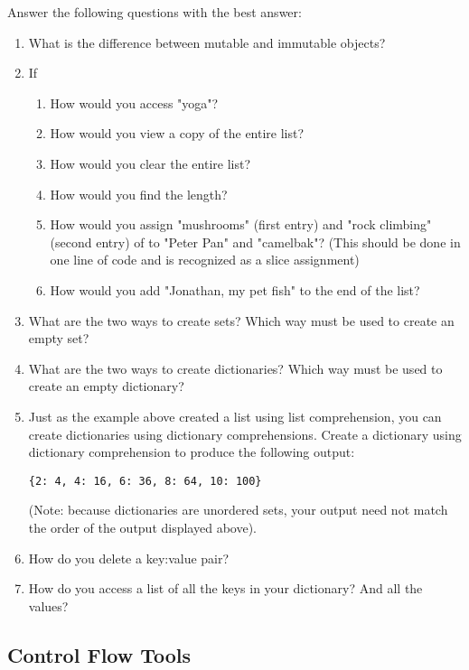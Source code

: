 \begin{problem}
Answer the following questions with the best answer:
\begin{enumerate}
\item What is the difference between mutable and immutable objects?
\item If 
\begin{enumerate}
	\item How would you access "yoga"? 
	\item How would you view a copy of the entire list?
	\item How would you clear the entire list? 
	\item How would you find the length? 
	\item How would you assign "mushrooms" (first entry) and "rock climbing" (second entry) 
	of  to "Peter Pan" and "camelbak"? 
	(This should be done in one line of code and is recognized as a slice assignment)
	\item How would you add "Jonathan, my pet fish" to the end of the list?
\end{enumerate}

\item What are the two ways to create sets? Which way must be used to 
create an empty set?
\item What are the two ways to create dictionaries? Which way must be used to
create an empty dictionary?
\item Just as the example above created a list using list comprehension, you can create dictionaries using dictionary comprehensions.
Create a dictionary using dictionary comprehension to produce the following output:

\begin{lstlisting}
{2: 4, 4: 16, 6: 36, 8: 64, 10: 100}
\end{lstlisting}
(Note: because dictionaries are unordered sets, your output need not match the order of the output displayed above).
\item How do you delete a key:value pair?
\item How do you access a list of all the keys in your dictionary? And all the values?
\end{enumerate}

\end{problem}


\subsection*{Control Flow Tools}

